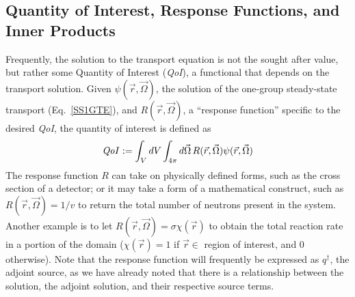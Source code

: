 \documentclass[12pt]{report}
\newcommand{\vr}{\vec{r}}
\newcommand{\vO}{\vec{\Omega}}
\newcommand{\qoi}{{\it QoI}\xspace}
\begin{document}
\subsection{Quantity of Interest, Response Functions, and Inner Products}
Frequently, the solution to the transport equation is not the sought after value, but rather some Quantity of Interest (\qoi), a functional that depends on the transport solution. Given $\psi(\vr,\vO)$, the solution of the one-group steady-state transport (Eq.~\eqref{SS1GTE}), and $R(\vr, \vO)$, a ``response function'' specific to the desired \qoi, the quantity of interest is defined as
\begin{equation}
\qoi :=  \int_V dV \int_{4 \pi} d \vO \,  R(\vr, \vO) \psi(\vr, \vO)
\end{equation}
The response function $R$ can take on physically defined forms, such as the cross section of a detector; or it may take a form of a mathematical construct, such as $R(\vr, \vO)=1/v$ to return the total number of neutrons present in the system. Another example is to let $R(\vr, \vO)=\sigma \chi(\vr)$ to obtain the total reaction rate in a portion of the domain ($\chi(\vr)=1$ if $\vr \in$ region of interest, and 0 otherwise). Note that the response function will frequently be expressed as $q^\dag$, the adjoint source, as we have already noted that there is a relationship between the solution, the adjoint solution, and their respective source terms. 
\end{document}
